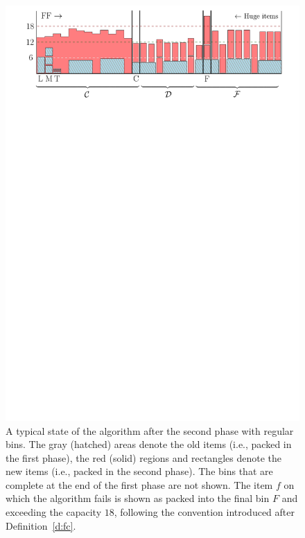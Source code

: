 \begin{figure}[th]
\begin{center}
\includegraphics[width=1\textwidth]{img/second_phase.pdf}
\end{center}
\caption[A typical state of the algorithm after the second phase
with regular bins.]{A typical state of the algorithm after the second phase with regular
  bins. The gray (hatched) areas denote the old items (i.e., packed in
  the first phase), the red (solid) regions and rectangles denote the
  new items (i.e., packed in the second phase). The bins that are
  complete at the end of the first phase are not shown. The item $f$
  on which the algorithm fails is shown as packed into the final bin
  $F$ and exceeding the capacity $18$, following the convention
  introduced after Definition~\ref{d:fc}.}
\label{fig:2}
\end{figure}

